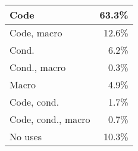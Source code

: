 \begin{tabular}{|l|r|} \hline
Code & 63.3\% \\ \hline
Code, macro & 12.6\% \\ \hline
Cond. & 6.2\% \\ \hline
Cond., macro & 0.3\% \\ \hline
Macro & 4.9\% \\ \hline
Code, cond. & 1.7\% \\ \hline
Code, cond., macro & 0.7\% \\ \hline
No uses & 10.3\% \\ \hline
\end{tabular}
